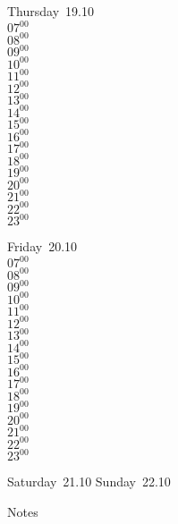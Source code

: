\documentclass[11pt, a4paper]{book}\usepackage[]{graphicx}\usepackage[]{color}
\begin{document}
\begin{weekdaybox}
  Thursday~19.10\\
  { 
  \vfill
  $07^{00}$\\
$08^{00}$\\
$09^{00}$\\
$10^{00}$\\
$11^{00}$\\
$12^{00}$\\
$13^{00}$\\
$14^{00}$\\
$15^{00}$\\
$16^{00}$\\
$17^{00}$\\
$18^{00}$\\
$19^{00}$\\
$20^{00}$\\
$21^{00}$\\
$22^{00}$\\
$23^{00}$\\
  }
\end{weekdaybox} 
\begin{weekdaybox}
  Friday~20.10\\
  { 
  \vfill
  $07^{00}$\\
$08^{00}$\\
$09^{00}$\\
$10^{00}$\\
$11^{00}$\\
$12^{00}$\\
$13^{00}$\\
$14^{00}$\\
$15^{00}$\\
$16^{00}$\\
$17^{00}$\\
$18^{00}$\\
$19^{00}$\\
$20^{00}$\\
$21^{00}$\\
$22^{00}$\\
$23^{00}$\\
  }
\end{weekdaybox}
\begin{weekendbox}
  Saturday~21.10
  \tcblower
  Sunday~22.10
\end{weekendbox} %
\begin{notebox}
  Notes
\end{notebox}
\clearpage
\end{document}
